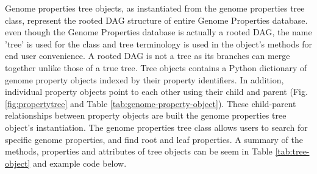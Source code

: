 Genome properties tree objects, as instantiated from the genome properties tree class, represent the rooted DAG structure of entire Genome Properties database. even though the Genome Properties database is actually a rooted DAG, the name 'tree' is used for the class and tree terminology is used in the object's methods for end user convenience. A rooted DAG is not a tree as its branches can merge together unlike those of a true tree. Tree objects contains a Python dictionary of genome property objects indexed by their property identifiers. In addition, individual property objects point to each other using their child and parent (Fig. \ref{fig:propertytree} and Table \ref{tab:genome-property-object}). These child-parent relationships between property objects are built the genome properties tree object's instantiation. The genome properties tree class allows users to search for specific genome properties, and find root and leaf properties. A summary of the methods, properties and attributes of tree objects can be seem in Table \ref{tab:tree-object} and example code below.

